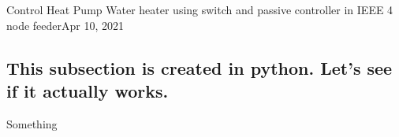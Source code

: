 \begin{entry}{Control Heat Pump Water heater using switch and passive controller in IEEE 4 node feeder}{Apr 10, 2021}
\subsection{This subsection is created in python. Let's see if it actually works.}
Something

\newpage


\end{entry}
